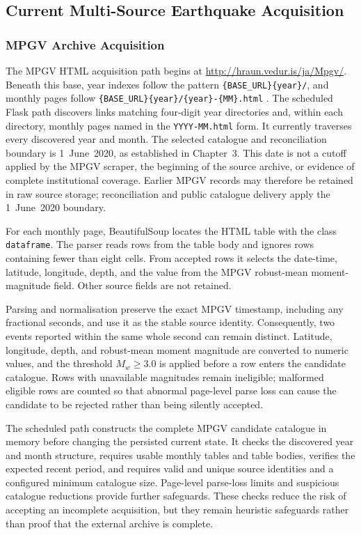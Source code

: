 \documentclass[12pt]{article}
\begin{document}
\subsection{Current Multi-Source Earthquake Acquisition}
\label{subsec:current-earthquake-acquisition}

\subsubsection{MPGV Archive Acquisition}
\label{subsubsec:mpgv-acquisition}

The MPGV HTML acquisition path begins at \url{http://hraun.vedur.is/ja/Mpgv/}. Beneath this base, year indexes follow the pattern \nolinkurl{{BASE_URL}{year}/}, and monthly pages follow \nolinkurl{{BASE_URL}{year}/{year}-{MM}.html} \cite{imo_mpgv_archive_index}. The scheduled Flask path discovers links matching four-digit year directories and, within each directory, monthly pages named in the \texttt{YYYY-MM.html} form. It currently traverses every discovered year and month. The selected catalogue and reconciliation boundary is 1~June~2020, as established in Chapter~3. This date is not a cutoff applied by the MPGV scraper, the beginning of the source archive, or evidence of complete institutional coverage. Earlier MPGV records may therefore be retained in raw source storage; reconciliation and public catalogue delivery apply the 1~June~2020 boundary.

For each monthly page, BeautifulSoup locates the HTML table with the class \texttt{dataframe}. The parser reads rows from the table body and ignores rows containing fewer than eight cells. From accepted rows it selects the date-time, latitude, longitude, depth, and the value from the MPGV robust-mean moment-magnitude field. Other source fields are not retained.

Parsing and normalisation preserve the exact MPGV timestamp, including any fractional seconds, and use it as the stable source identity. Consequently, two events reported within the same whole second can remain distinct. Latitude, longitude, depth, and robust-mean moment magnitude are converted to numeric values, and the threshold $M_w \geq 3.0$ is applied before a row enters the candidate catalogue. Rows with unavailable magnitudes remain ineligible; malformed eligible rows are counted so that abnormal page-level parse loss can cause the candidate to be rejected rather than being silently accepted.

The scheduled path constructs the complete MPGV candidate catalogue in memory before changing the persisted current state. It checks the discovered year and month structure, requires usable monthly tables and table bodies, verifies the expected recent period, and requires valid and unique source identities and a configured minimum catalogue size. Page-level parse-loss limits and suspicious catalogue reductions provide further safeguards. These checks reduce the risk of accepting an incomplete acquisition, but they remain heuristic safeguards rather than proof that the external archive is complete.
\end{document}
